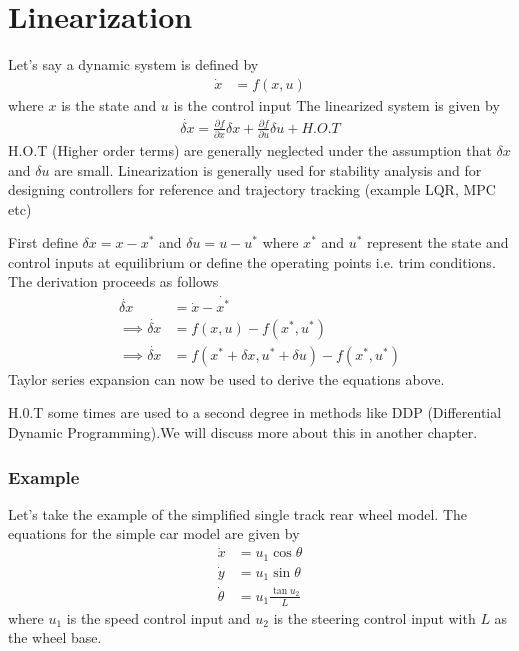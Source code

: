 \section{Linearization}
Let's say a dynamic system is defined by
\begin{align}
    \dot{x} &= f(x, u)
\end{align}
where $x$ is the state and $u$ is the control input
The linearized system is given by
\begin{align}
    \dot{\delta x} = \frac{\partial f}{\partial x} \delta x + \frac{\partial f}{\partial u} \delta u + H.O.T
\end{align}
H.O.T (Higher order terms) are generally neglected under the assumption that $\delta x$ and $\delta u$ are small. Linearization is generally used for stability analysis and for designing controllers for reference and trajectory tracking (example LQR, MPC etc) 

First define $\delta x = x - x^{*}$ and $\delta u = u - u^{*}$ where $x^*$ and $u^*$ represent the state and control inputs at equilibrium  or define the operating points i.e. trim conditions.
The derivation proceeds as follows
\begin{align}
    \dot{\delta x} &= \dot{x} - \dot{x^*} \\
    \implies \dot{\delta x} &= f(x, u) - f(x^*, u^*) \\
    \implies \dot{\delta x} &= f(x^* + \delta x, u^* + \delta u)- f(x^*, u^*)
\end{align}
Taylor series expansion can now be used to derive the equations above. 

H.0.T some times are used to a second degree in methods like DDP (Differential Dynamic Programming).We will discuss more about this in another chapter. 

\subsubsection{Example}
Let's take the example of the simplified single track rear wheel model. The equations for the simple car model are given by
\begin{align*}
    \dot{x} &= u_1\cos{\theta} \\
    \dot{y} &= u_1\sin{\theta} \\
    \dot{\theta} &= u_1\frac{\tan u_2}{L}
\end{align*}
where $u_1$ is the speed control input and $u_2$ is the steering control input with $L$ as the wheel base.

